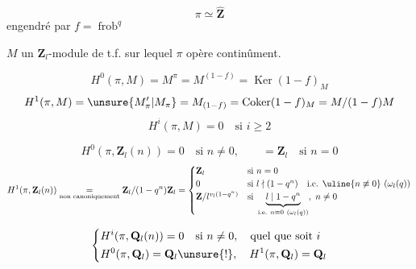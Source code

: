 

\[
\pi\simeq\widehat{\mathbf Z}
\]
engendré par $f=\operatorname{frob}^q$

$M$ un $\mathbf Z_l$-module de t.f. sur lequel $\pi$ opère continûment.

\[
H^0(\pi,M)=M^\pi=M^{(1-f)}=\operatorname{Ker}(1-f)_M
\]
\[
H^1(\pi,M)=\unsure{M'_\pi|M_\pi}=M_{(1-f)}=\operatorname{Coker}(1-f)_M=M/(1-f)M
\]
\[
H^i(\pi,M)=0\quad\text{si }i\geq2
\]

\[
H^0(\pi,\mathbf Z_l(n))=0\quad\text{si }n\neq0,\qquad=\mathbf Z_l\quad\text{si }n=0
\]
\[
H^1(\pi,\mathbf Z_l(n))\underset{\text{non canoniquement}}{=}
\mathbf Z_l/(1-q^n)\mathbf Z_l
=\begin{cases}
\mathbf Z_l&\text{si }n=0\\
0&\text{si }l\nmid(1-q^n)\quad\text{i.e. }\uline{n\not\equiv0}\ (\omega_l(q))\\
\mathbf Z/l^{v_l(1-q^n)}&\text{si }\underbrace{l\mid1-q^n}_{\text{i.e. }n\equiv0\ (\omega_l(q))},\ n\neq0
\end{cases}
\]

\[
\left\{\begin{aligned}
&H^i(\pi,\mathbf Q_l(n))=0\quad\text{si }n\neq0,\quad\text{quel que soit }i\\
&H^0(\pi,\mathbf Q_l)=\mathbf Q_l\unsure{!},\quad H^1(\pi,\mathbf Q_l)=\mathbf Q_l
\end{aligned}\right.
\]

